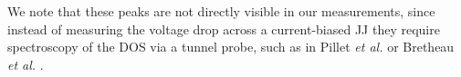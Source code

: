 We note that these peaks are not directly visible in our measurements, since instead of measuring the voltage drop across a current-biased JJ they require spectroscopy of the DOS via a tunnel probe, such as in Pillet \emph{et al.} or Bretheau \emph{et al.} \cite{pillet_andreev_2010a,bretheau_tunnelling_2017a}.


